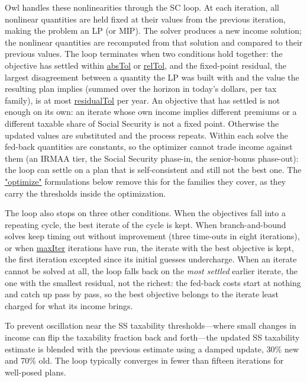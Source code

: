 \documentclass[fleqn,12pt]{report}
\newcommand{\code}[1]{\url{#1}}
\begin{document}
Owl handles these nonlinearities through the SC loop.
At each iteration, all nonlinear quantities are held fixed at their values
from the previous iteration, making the problem an LP (or MIP).
The solver produces a new income solution; the nonlinear quantities are
recomputed from that solution and compared to their previous values.
The loop terminates when two conditions hold together: the objective has
settled within \code{absTol} or \code{relTol}, and the fixed-point residual,
the largest disagreement between a quantity the LP was built with and the value
the resulting plan implies (summed over the horizon in today's dollars, per tax
family), is at most \code{residualTol} per year.  An objective that has
settled is not enough on its own: an iterate whose own income implies different
premiums or a different taxable share of Social Security is not a fixed point.
Otherwise the updated values are substituted and the process repeats.
Within each solve the fed-back quantities are constants, so the optimizer cannot
trade income against them (an IRMAA tier, the Social Security phase-in, the
senior-bonus phase-out): the loop can settle on a plan that is self-consistent and
still not the best one.
The \code{"optimize"} formulations below remove this for the families they cover,
as they carry the thresholds inside the optimization.

The loop also stops on three other conditions.  When the objectives fall into a
repeating cycle, the best iterate of the cycle is kept.  When branch-and-bound
solves keep timing out without improvement (three time-outs in eight
iterations), or when \code{maxIter} iterations have run, the iterate with the best
objective is kept, the first iteration excepted since its initial guesses
undercharge.  When an iterate cannot be solved at all, the loop falls back on the
\emph{most settled} earlier iterate, the one with the smallest residual, not the
richest: the fed-back costs start at nothing and catch up pass by pass, so the
best objective belongs to the iterate least charged for what its income brings.

To prevent oscillation near the SS taxability thresholds---where small
changes in income can flip the taxability fraction back and forth---the
updated SS taxability estimate is blended with the previous estimate using
a damped update, 30\% new and 70\% old.
The loop typically converges in fewer than fifteen iterations for
well-posed plans.
\end{document}
